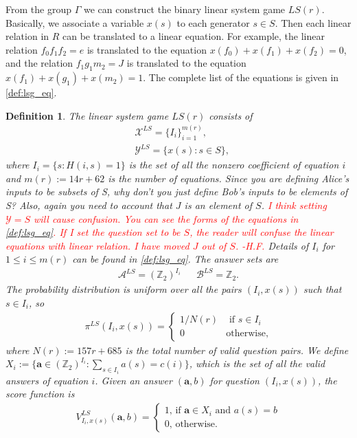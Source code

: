 \documentclass[11pt,letterpaper]{article}
\newcommand{\Z}{\mathbb{Z}}
\newcommand{\calX}{\mathcal{X}}
\newcommand{\calY}{\mathcal{Y}}
\newcommand{\calA}{\mathcal{A}}
\newcommand{\calB}{\mathcal{B}}
\newcommand{\1}{\mathbb{1}}
\newcommand{\LS}{LS}
\newcommand{\mr}{m(r)}
\newcommand{\ba}{\pmb{a}}
\def\carl#1{{\color{blue} #1}}
\newcommand{\hfc}[1]{\textcolor{red}{#1 -H.F.}}
\newtheorem{definition}[theorem]{Definition}
\theoremstyle{definition}
\begin{document}
From the group $\Gamma$ we can construct the binary linear system game $\LS(r)$. Basically,
we associate a variable $x(s)$ to each generator $s \in S$.
Then each linear relation in $R$ can be translated to a linear equation.
For example, the linear relation $f_0f_1f_2 = e$ is translated to the equation $x(f_0) + x(f_1) + x(f_2) = 0$, and the relation 
$f_1g_1m_2 = J$ is translated to the equation
$x(f_1) + x(g_1) + x(m_2) = 1$. 
The complete list of the equations is given in \cref{def:lsg_eq}.
\begin{definition}
\label{def:lsg}
The linear system game $\LS(r)$ consists of
\begin{align*}
    & \calX^{\LS} = \{I_i\}_{i=1}^{\mr}, \\
    & \calY^{\LS} = \{ x(s) : s \in S \},
\end{align*}
where $I_i = \{ s : H(i,s) = 1\}$ is the set of all the nonzero coefficient of equation $i$
and $\mr := 14r + 62$ is the number of equations.  
\carl{Since you are defining Alice's inputs to be subsets of S, why don't you just define Bob's inputs to be elements of S? Also, again you need to account that
$J$ is an element of $S$.}
\hfc{I think setting $\calY = S$ will cause confusion.
You can see the forms of the equations in \cref{def:lsg_eq}.
If I set the question set to be $S$, the reader will confuse the 
linear equations with linear relation.
I have moved $J$ out of $S$.}
Details of $I_i$ for $1 \leq i \leq \mr$ can be found in \cref{def:lsg_eq}.
The answer sets are 
\begin{align*}
    \calA^{\LS} = (\Z_2)^{I_i} && \calB^{\LS} = \Z_2.
\end{align*}
The probability distribution is uniform over all the pairs $(I_i, x(s))$ such that $s \in I_i$, so
\begin{align*}
    \pi^{\LS}(I_i, x(s)) = 
    \begin{cases}
        1/N(r) & \text{ if } s \in I_i \\
        0 & \text{otherwise,}
    \end{cases}
\end{align*}
where $N(r) := 157r + 685$ is the total number of valid question pairs.
We define $X_i := \{ \ba \in (\Z_2)^{I_i}: \sum_{s \in I_i} a(s) = c(i) \}$, which is the set of all the valid answers of equation $i$.
Given an answer $(\ba,b)$ for question $(I_i,x(s))$, 
the score function is
\begin{align*}
    V^{\LS}_{I_i, x(s)}(\ba, b) = 
    \begin{cases}
        1 \text{, if } \ba \in X_i \text{ and } a(s) = b\\
        0 \text{, otherwise}.
    \end{cases}
\end{align*}
\end{definition}
\end{document}
